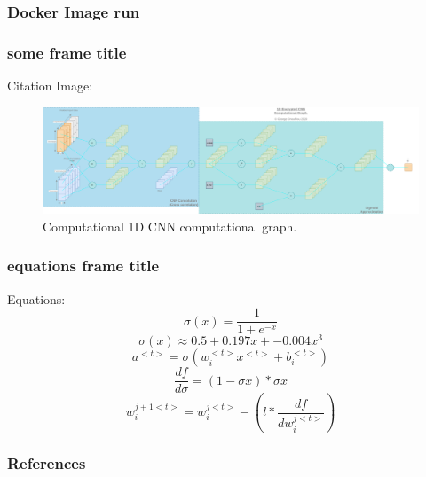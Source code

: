 \documentclass{beamer}
\begin{document}
  \begin{frame}
    \frametitle{Docker Image run}
  \end{frame}

  \begin{frame}
    \frametitle{some frame title}
    Citation \autocite{gentry2009fully, Goodfellow-et-al-2016}
    Image:
    \begin{figure}[th!]
      \centering
      \includegraphics[width=\textwidth]{encrypted_cnn.png}
      \caption{Computational 1D CNN computational graph.}
      \label{fig:gan}
    \end{figure}
  \end{frame}

  \begin{frame}
    \frametitle{equations frame title}
    Equations:
    \begin{equation}
      \label{sigmoid}
      \sigma(x) = \frac{1}{1+e^{-x}}
    \end{equation}
    \begin{equation}
      \label{sigmoid_approx}
      \sigma(x) \approx 0.5 + 0.197x + -0.004x^3
    \end{equation}
    \begin{equation}
      \label{cnn_activation}
      a^{<t>}=\sigma(w_{i}^{<t>}x^{<t>}+b_i^{<t>})
    \end{equation}
    \begin{equation}
      \label{gradient}
      \frac{df}{d\sigma} = (1-\sigma{x}) * \sigma{x}
    \end{equation}
    \begin{equation}
      \label{weight_update}
      w_i^{j+1<t>} = w_i^{j<t>} - (l * \frac{df}{dw_i^{j<t>}})
    \end{equation}
  \end{frame}

  \begin{frame}[allowframebreaks]
    \frametitle{References}
    \printbibliography
  \end{frame}
\end{document}
